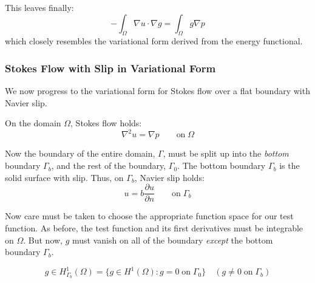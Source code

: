 \documentclass[a4paper]{report}
\begin{document}
This leaves finally:
\begin{equation}
- \int_{\Omega} \nabla u \cdot \nabla g  
= \int_{\Omega} g \nabla p
\end{equation}
which closely resembles the variational form derived from the energy functional.


\subsubsection*{Stokes Flow with Slip in Variational Form}

We now progress to the variational form for Stokes flow over a flat boundary with Navier slip.

On the domain $\Omega$, Stokes flow holds:
\begin{equation}
\nabla^2 u = \nabla p \qquad \text{on} \; \Omega
\end{equation}

Now the boundary of the entire domain, $\Gamma$, must be split up into the \emph{bottom} boundary $\Gamma_b$, and the rest of the boundary, $\Gamma_0$.  The bottom boundary $\Gamma_b$ is the solid surface with slip.  Thus, on $\Gamma_b$, Navier slip holds:
\begin{equation}
u = b \frac{\partial u}{\partial n} \qquad \text{on} \; \Gamma_b
\end{equation}

\vspace{1em}
\begin{center}
\end{center}



Now care must be taken to choose the appropriate function space for our test function.  As before, the  test function and its first derivatives must be integrable on $\Omega$.  
But now, $g$ must vanish on all of the boundary \emph{except} the bottom boundary $\Gamma_b$.

\begin{equation}
g \in H^1_{\Gamma_b} (\Omega) = \lbrace g \in H^1(\Omega): g = 0 \; \text{on}\; \Gamma_0 \rbrace 
\quad (g \neq 0 \; \text{on} \; \Gamma_b)
\end{equation}
\end{document}
